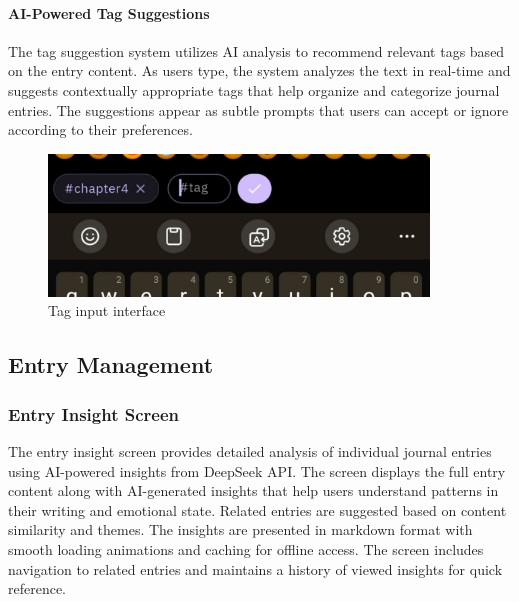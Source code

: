 \paragraph{AI-Powered Tag Suggestions}

The tag suggestion system utilizes AI analysis to recommend relevant tags based on the entry content. As users type, the system analyzes the text in real-time and suggests contextually appropriate tags that help organize and categorize journal entries. The suggestions appear as subtle prompts that users can accept or ignore according to their preferences.

\begin{figure}[H]
\centering
\begin{minipage}{0.45\textwidth}
\centering
\includegraphics[width=0.9\textwidth]{files/imgs/prototype/tag_input.jpeg}
\caption{Tag input interface}
\label{fig:tag-input}
\end{minipage}
\hfill
\end{figure}

\subsection{Entry Management}

\subsubsection{Entry Insight Screen}

The entry insight screen provides detailed analysis of individual journal entries using AI-powered insights from DeepSeek API. The screen displays the full entry content along with AI-generated insights that help users understand patterns in their writing and emotional state. Related entries are suggested based on content similarity and themes. The insights are presented in markdown format with smooth loading animations and caching for offline access. The screen includes navigation to related entries and maintains a history of viewed insights for quick reference.

